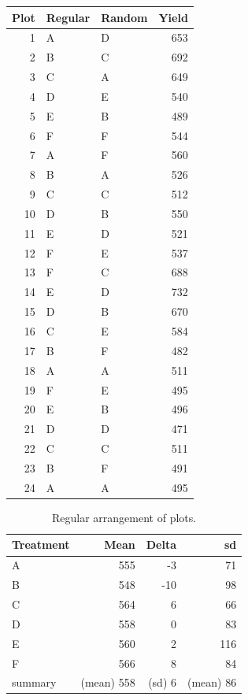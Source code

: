 \documentclass[landscape]{article}
\begin{document}
  \begin{table}[ht]
    \centering
    \begin{tabular}{rllr}
      \toprule
      Plot & Regular & Random & Yield \\
      \midrule
      1    & A       & D      & 653 \\
      2    & B       & C      & 692 \\
      3    & C       & A      & 649 \\
      4    & D       & E      & 540 \\
      5    & E       & B      & 489 \\
      6    & F       & F      & 544 \\
      7    & A       & F      & 560 \\
      8    & B       & A      & 526 \\
      9    & C       & C      & 512 \\
      10   & D       & B      & 550 \\
      11   & E       & D      & 521 \\
      12   & F       & E      & 537 \\
      13   & F       & C      & 688 \\
      14   & E       & D      & 732 \\
      15   & D       & B      & 670 \\
      16   & C       & E      & 584 \\
      17   & B       & F      & 482 \\
      18   & A       & A      & 511 \\
      19   & F       & E      & 495 \\
      20   & E       & B      & 496 \\
      21   & D       & D      & 471 \\
      22   & C       & C      & 511 \\
      23   & B       & F      & 491 \\
      24   & A       & A      & 495 \\
      \bottomrule
    \end{tabular}
  \end{table}
  
  \begin{table}[ht]
    \centering
    \begin{tabular}{lrrr}
      \toprule
      Treatment & Mean & Delta & sd \\
      \midrule
      A       & 555        & -3     & 71 \\
      B       & 548        & -10    & 98 \\
      C       & 564        & 6      & 66 \\
      D       & 558        & 0      & 83 \\
      E       & 560        & 2      & 116 \\
      F       & 566        & 8      & 84 \\
      \midrule
      summary & (mean) 558 & (sd) 6 & (mean) 86 \\
      \bottomrule
    \end{tabular}
    \caption{Regular arrangement of plots.}
  \end{table}
\end{document}
